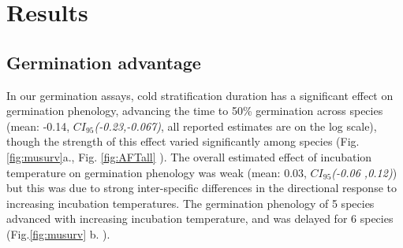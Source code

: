 \documentclass{article}\usepackage[]{graphicx}\usepackage[]{color}
\begin{document}

\section*{Results}
\subsection*{Germination advantage}
In our germination assays, cold stratification duration has a significant effect on germination phenology, advancing the time to 50\% germination across species (mean: -0.14, $CI_{95}$\textit{(-0.23,-0.067)}, all reported estimates are on the log scale), though the strength of this effect varied significantly among species  (Fig. \ref{fig:musurv}a., Fig. \ref{fig:AFTall} ). The overall estimated effect of incubation temperature on germination phenology was weak (mean: 0.03, $CI_{95}$\textit{(-0.06 ,0.12)}) but this was due to strong inter-specific differences in the directional response to increasing incubation temperatures. The germination phenology of 5 species advanced with increasing incubation temperature, and was delayed for 6 species (Fig.\ref{fig:musurv} b. ).\\%
\end{document}
